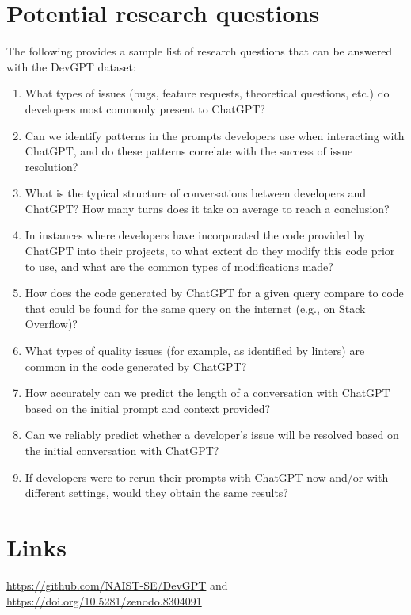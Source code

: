 \documentclass[10pt,conference]{IEEEtran}
\begin{document}
\section{Potential research questions}
The following provides a sample list of research questions that can be answered with the DevGPT dataset:
\begin{enumerate}
    \item What types of issues (bugs, feature requests, theoretical questions, etc.) do developers most commonly present to ChatGPT?
    \item Can we identify patterns in the prompts developers use when interacting with ChatGPT, and do these patterns correlate with the success of issue resolution?
    \item What is the typical structure of conversations between developers and ChatGPT? How many turns does it take on average to reach a conclusion?
    \item In instances where developers have incorporated the code provided by ChatGPT into their projects, to what extent do they modify this code prior to use, and what are the common types of modifications made?
    \item How does the code generated by ChatGPT for a given query compare to code that could be found for the same query on the internet (e.g., on Stack Overflow)?
    \item What types of quality issues (for example, as identified by linters) are common in the code generated by ChatGPT?
    \item How accurately can we predict the length of a conversation with ChatGPT based on the initial prompt and context provided?
    \item Can we reliably predict whether a developer's issue will be resolved based on the initial conversation with ChatGPT?
    \item If developers were to rerun their prompts with ChatGPT now and/or with different settings, would they obtain the same results?
\end{enumerate}

\section{Links}
\label{sec:link}
\url{https://github.com/NAIST-SE/DevGPT} and
\url{https://doi.org/10.5281/zenodo.8304091}


%
%
\end{document}
